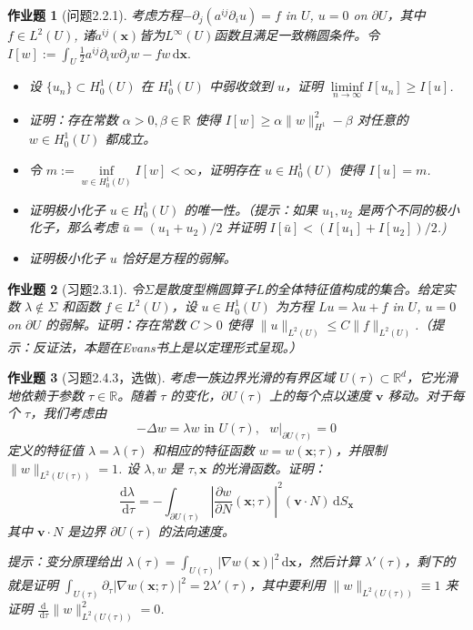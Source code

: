 \documentclass[UTF8,fontset=windows,12pt]{ctexart}
\theoremstyle{kaiti-theorem}
\newtheorem{problem}{作业题}
\numberwithin{equation}{section}
\newcommand{\R}{\mathbb{R}}
\newcommand{\bds}[1]{\boldsymbol{#1}}  %
\newcommand{\p}{\partial}
\newcommand{\lap}{\Delta}
\newcommand{\nab}{\nabla}
\newcommand{\dxx}{\,\mathrm{d}\bds{x}}
\newcommand{\dtt}{\,\mathrm{d}\tau}
\newcommand{\dS}{\,\mathrm{d}S}
\newcommand{\lam}{\lambda}
\newcommand{\iu}{\int_{U}}
\newcommand{\xx}{{\bds{x}}}
\newcommand{\vv}{\mathbf{v}}
\begin{document}
\begin{problem}[问题2.2.1]
考虑方程$-\p_j(a^{ij}\p_i u)=f$ in $U$, $u=0$ on $\p U$，其中$f\in L^2(U)$, 诸$a^{ij}(\xx)$皆为$L^\infty(U)$函数且满足一致椭圆条件。令 $I[w]:=\iu \frac12 a^{ij}\p_i w\p_j w - fw \dxx.$
\begin{itemize}
\item [(1)] 设 $\{u_n\} \subset H_0^1(U)$ 在 $H_0^1(U)$ 中弱收敛到 $u$，证明 $\liminf\limits_{n\to\infty} I[u_n] \geqslant I[u]$. 
\item [(2)] 证明：存在常数 $\alpha>0, \beta \in \R$ 使得 $I[w] \geqslant \alpha \|w\|_{H^1}^2 - \beta$ 对任意的 $w\in H_0^1(U)$ 都成立。
\item [(3)] 令 $m:=\inf\limits_{w\in H_0^1(U)} I[w]<\infty$，证明存在 $u\in H_0^1(U)$ 使得 $I[u]=m$.
\item [(4)] 证明极小化子 $u\in H_0^1(U)$ 的唯一性。（提示：如果 $u_1,u_2$ 是两个不同的极小化子，那么考虑 $\bar{u}=(u_1+u_2)/2$ 并证明 $I[\bar{u}]<(I[u_1]+I[u_2])/2$.)
\item [(5)] 证明极小化子 $u$ 恰好是方程的弱解。
\end{itemize}
\end{problem}


\begin{problem}[习题2.3.1]
令$\Sigma$是散度型椭圆算子$L$的全体特征值构成的集合。给定实数 $\lam\notin \Sigma$ 和函数 $f\in L^2(U)$，设 $u\in H_0^1(U)$ 为方程 $Lu=\lam u+f$ in $U$, $u=0$ on $\p U$ 的弱解。证明：存在常数 $C>0$ 使得 $\|u\|_{L^2(U)}\leqslant C\|f\|_{L^2(U)}$.（提示：反证法，本题在Evans书上是以定理形式呈现。）
\end{problem}

%
%
\begin{problem}[习题2.4.3，选做]
考虑一族边界光滑的有界区域 $U(\tau)\subset\R^d$，它光滑地依赖于参数 $\tau\in\R$。随着 $\tau$ 的变化，$\p U(\tau)$ 上的每个点以速度 $\vv$ 移动。对于每个 $\tau$，我们考虑由 $$-\lap w=\lambda w \text{ in }U(\tau),~~~w|_{\p U(\tau)}=0$$ 定义的特征值 $\lam=\lam(\tau)$ 和相应的特征函数 $w=w(\xx;\tau)$，并限制 $\|w\|_{L^2(U(\tau))}=1$.
设 $\lam, w$ 是 $\tau,\xx$ 的光滑函数。证明：
\[
\frac{\mathrm{d}\lam}{\dtt}=-\int_{\p U(\tau)}\left|\frac{\p w}{\p N}(\xx;\tau)\right|^2(\vv\cdot N)\dS_\xx
\]其中 $\vv\cdot N$ 是边界 $\p U(\tau)$ 的法向速度。

提示：变分原理给出 $\lam(\tau)=\int_{U(\tau)}|\nab w(\xx)|^2\dxx$，然后计算 $\lam'(\tau)$，剩下的就是证明 $\int_{U(\tau)}\p_{\tau}|\nab w(\xx;\tau)|^2=2\lam'(\tau)$，其中要利用 $\|w\|_{L^2(U(\tau))}\equiv 1$ 来证明 $\frac{\mathrm{d}}{\dtt}\|w\|_{L^2(U(\tau))}^2=0$. 
\end{problem}
\end{document}
